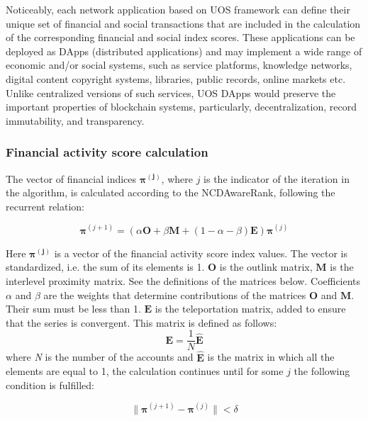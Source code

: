\documentclass[a4paper,12pt]{article}
\begin{document}
Noticeably, each network application based on U{\degree}OS framework can define their unique set of financial and social transactions that are included in the calculation of the corresponding financial and social index scores. These applications can be deployed as DApps (distributed applications) and may implement a wide range of economic and/or social systems, such as service platforms, knowledge networks, digital content copyright systems, libraries, public records, online markets etc. Unlike centralized versions of such services, U{\degree}OS DApps would preserve the important properties of blockchain systems, particularly, decentralization, record immutability, and transparency.






\subsubsection{Financial activity score calculation}
The vector of financial indices $\boldsymbol{\pi^{(j)}}$, where $j$ is the indicator of the iteration in the algorithm, is calculated according to the NCDAwareRank, following the recurrent relation: 

\begin{equation}
	    \label{recurrent_formula_for_ncdawarerank}
	    \boldsymbol{\pi}^{(j+1)} = ( \alpha \boldsymbol{O} + \beta \boldsymbol{M} + ( 1 - \alpha - \beta ) \boldsymbol{E} ) \boldsymbol{\pi}^{(j)}
	\end{equation}

Here $\boldsymbol{\pi^{(j)}}$ is a vector of the financial activity score index values. The vector is standardized, i.e. the sum of its elements is 1. $\boldsymbol{O}$ is the outlink matrix, $\boldsymbol{M}$ is the interlevel proximity matrix. See the definitions of the matrices below. Coefficients $\alpha$ and $\beta$ are the weights that determine contributions of the matrices $\boldsymbol{O}$ and $\boldsymbol{M}$. Their sum must be less than 1. $\boldsymbol{E}$ is the teleportation matrix, added to ensure that the series is convergent. This matrix is defined as follows:
$$
\boldsymbol{E}=\frac{1}{N}\boldsymbol{\hat{E}}
$$
where \textit{N} is the number of the accounts and $\boldsymbol{\hat{E}}$ is the matrix in which all the elements are equal to 1, the calculation continues until for some $j$ the following condition is fulfilled: 



$$
\lVert \boldsymbol{\pi}^{(j+1)}-\boldsymbol{\pi}^{(j)} \rVert <\delta
$$
\end{document}
